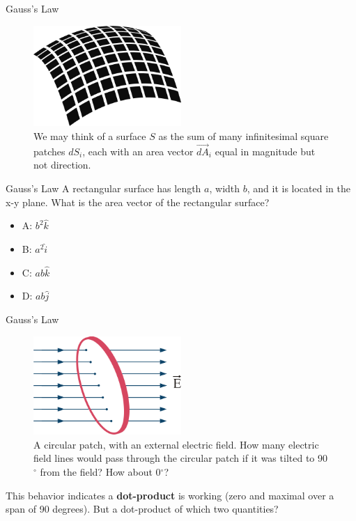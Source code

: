 \documentclass{beamer}
\begin{document}
\begin{frame}{Gauss's Law}
\begin{figure}
\centering
\includegraphics[width=0.5\textwidth]{figures/patch.png}
\caption{\label{fig:patch} We may think of a surface $S$ as the sum of many infinitesimal square patches $dS_i$, each with an area vector $\vec{dA}_i$ equal in magnitude but not direction.}
\end{figure}
\end{frame}

\begin{frame}{Gauss's Law}
A rectangular surface has length $a$, width $b$, and it is located in the x-y plane.  What is the area vector of the rectangular surface?
\begin{itemize}
\item A: $b^2 \hat{k}$
\item B: $a^2 \hat{i}$
\item C: $ab \hat{k}$
\item D: $ab \hat{j}$
\end{itemize}
\end{frame}

\begin{frame}{Gauss's Law}
\small
\begin{figure}
\centering
\includegraphics[width=0.5\textwidth]{figures/coin.png}
\caption{\label{fig:coin} A circular patch, with an external electric field.  How many electric field lines would pass through the circular patch if it was tilted to 90$^{\circ}$ from the field?  How about 0$^{\circ}$?}
\end{figure}
This behavior indicates a \textbf{dot-product} is working (zero and maximal over a span of 90 degrees).  But a dot-product of which two quantities?
\end{frame}
\end{document}
